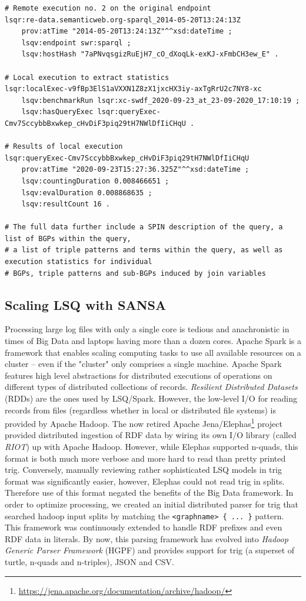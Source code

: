 \begin{lstlisting}
# Remote execution no. 2 on the original endpoint
lsqr:re-data.semanticweb.org-sparql_2014-05-20T13:24:13Z	
	prov:atTime "2014-05-20T13:24:13Z"^^xsd:dateTime ;
	lsqv:endpoint swr:sparql ;
	lsqv:hostHash "7aPNvqsgizRuEjH7_cO_dXoqLk-exKJ-xFmbCH3ew_E" .

# Local execution to extract statistics
lsqr:localExec-v9fBp3ElS1aVXXN1Z8zX1jxcHX3iy-axTgRrU2c7NY8-xc	
	lsqv:benchmarkRun lsqr:xc-swdf_2020-09-23_at_23-09-2020_17:10:19 ;
	lsqv:hasQueryExec lsqr:queryExec-Cmv7SccybbBxwkep_cHvDiF3piq29tH7NWlDfIiCHqU .

# Results of local execution
lsqr:queryExec-Cmv7SccybbBxwkep_cHvDiF3piq29tH7NWlDfIiCHqU	
	prov:atTime "2020-09-23T15:27:36.325Z"^^xsd:dateTime ;
	lsqv:countingDuration 0.008466651 ;
	lsqv:evalDuration 0.008868635 ;
	lsqv:resultCount 16 .
		
# The full data further include a SPIN description of the query, a list of BGPs within the query,
# a list of triple patterns and terms within the query, as well as execution statistics for individual
# BGPs, triple patterns and sub-BGPs induced by join variables
\end{lstlisting}


\subsection{Scaling LSQ with SANSA}
\label{sec:sansa}
Processing large log files with only a single core is tedious and anachronistic in times of Big Data and laptops having more than a dozen cores. Apache Spark is a framework that enables scaling computing tasks to use all available resources on a cluster -- even if the "cluster" only comprises a single machine. Apache Spark features high level abstractions for distributed executions of operations on different types of distributed collections of records. \emph{Resilient Distributed Datasets} (RDDs) are the ones used by LSQ/Spark.
However, the low-level I/O for reading records from files (regardless whether in local or distributed file systems) is provided by Apache Hadoop.
The now retired Apache Jena/Elephas\footnote{\url{https://jena.apache.org/documentation/archive/hadoop/}} project provided distributed ingestion of RDF data by wiring its own I/O library (called \emph{RIOT}) up with Apache Hadoop. However, while Elephas supported n-quads, this format is both much more verbose and more hard to read than pretty printed trig.
Conversely, manually reviewing rather sophisticated LSQ models in trig format was significantly easier, however, Elephas could not read trig in splits. Therefore use of this format negated the benefits of the Big Data framework.
In order to optimize processing, we created an initial distributed parser for trig that searched hadoop input splits by matching the \texttt{<graphname> \{ ... \}} pattern.
This framework was continuously extended to handle RDF prefixes and even RDF data in literals.
By now, this parsing framework has evolved into \emph{Hadoop Generic Parser Framework} (HGPF) and provides support for trig (a superset of turtle, n-quads and n-triples), JSON and CSV.

